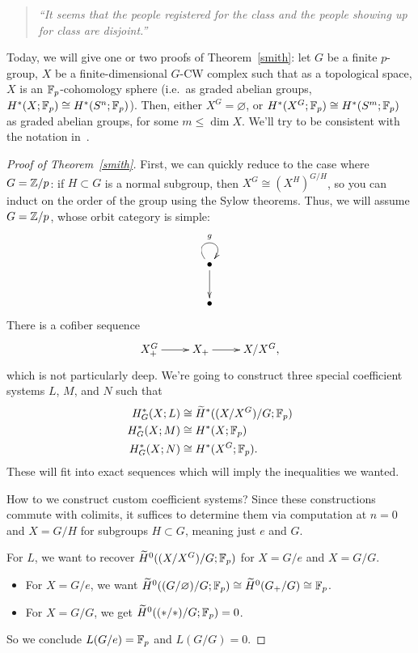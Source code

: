 \begin{quote}\textit{
	``It seems that the people registered for the class and the people showing up for class are disjoint.''
}\end{quote}
Today, we will give one or two proofs of Theorem~\ref{smith}: let $G$ be a finite $p$-group, $X$ be a
finite-dimensional $G$-CW complex such that as a topological space, $X$ is an $\mathbb F_p$-cohomology sphere (i.e.\ as
graded abelian groups, $H^*(X;\mathbb F_p)\cong H^*(S^n;\mathbb F_p)$). Then, either $X^G = \varnothing$, or $H^*(X^G;\mathbb F_p)\cong
H^*(S^m;\mathbb F_p)$ as graded abelian groups, for some $m\le\dim X$. We'll try to be consistent with the notation
in~\cite{MaySmithTheory, AlaskaNotes}.
\begin{proof}[Proof of Theorem~\ref{smith}]
First, we can quickly reduce to the case where $G = \mathbb Z/p$: if $H\subset G$ is a normal subgroup, then $X^G\cong
(X^H)^{G/H}$, so you can induct on the order of the group using the Sylow theorems. Thus, we will assume $G =
\mathbb Z/p$, whose orbit category is simple:
\[\xymatrix{
	\bullet\ar@(ul, ur)^g\ar[d]\\
	\bullet
}\]
There is a cofiber sequence
\[\xymatrix{
	X_+^G\ar[r] & X_+\ar[r] & X/X^G,
}\]
which is not particularly deep. We're going to construct three special coefficient systems $L$, $M$, and $N$ such
that
\begin{align*}
	H_G^*(X;L) &\cong \widetilde H^*((X/X^G)/G; \mathbb F_p)\\
	H_G^*(X;M) &\cong H^*(X;\mathbb F_p)\\
	H_G^*(X;N) &\cong H^*(X^G;\mathbb F_p).
\end{align*}
These will fit into exact sequences which will imply the inequalities we wanted.

How to we construct custom coefficient systems? Since these constructions commute with colimits, it suffices to
determine them via computation at $n = 0$ and $X = G/H$ for subgroups $H\subset G$, meaning just $e$ and $G$.

For $L$, we want to recover $\widetilde H^0((X/X^G)/G;\mathbb F_p)$ for $X = G/e$ and $X = G/G$.
\begin{itemize}
	\item For $X = G/e$, we want $\widetilde H^0((G/\varnothing)/G;\mathbb F_p)\cong \widetilde H^0(G_+/G)\cong\mathbb F_p$.
	\item For $X = G/G$, we get $\widetilde H^0((*/*)/G;\mathbb F_p) = 0$.
\end{itemize}
So we conclude $L(G/e) = \mathbb F_p$ and $L(G/G) = 0$.


\end{proof}
